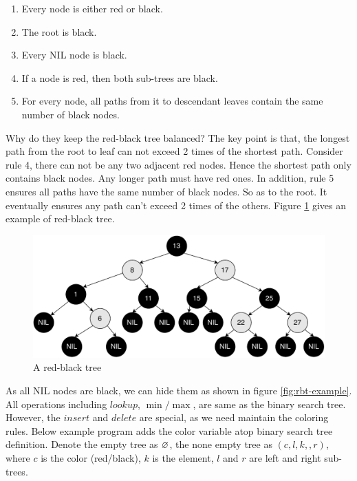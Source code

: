 \documentclass[b5paper]{article}
\begin{document}
\begin{enumerate}
\item Every node is either red or black.
\item The root is black.
\item Every NIL node is black.
\item If a node is red, then both sub-trees are black.
\item For every node, all paths from it to descendant leaves contain the same number of black nodes.
\end{enumerate}

Why do they keep the red-black tree balanced? The key point is that, the longest path from the root to leaf can not exceed 2 times of the shortest path. Consider rule 4, there can not be any two adjacent red nodes. Hence the shortest path only contains black nodes. Any longer path must have red ones. In addition, rule 5 ensures all paths have the same number of black nodes. So as to the root. It eventually ensures any path can't exceed 2 times of the others\cite{wiki-rbt}. Figure \cref{fig:rbt-example-with-nil} gives an example of red-black tree.

\begin{figure}[htbp]
  \centering
  \includegraphics[scale=0.35]{img/rbt-example-with-nil}
  \caption{A red-black tree}
  \label{fig:rbt-example-with-nil}
\end{figure}

As all NIL nodes are black, we can hide them as shown in figure \cref{fig:rbt-example}. All operations including $lookup$, $\min/\max$, are same as the binary search tree. However, the $insert$ and $delete$ are special, as we need maintain the coloring rules. Below example program adds the color variable atop binary search tree definition. Denote the empty tree as $\varnothing$, the none empty tree as $(c, l, k,, r)$, where $c$ is the color (red/black), $k$ is the element, $l$ and $r$ are left and right sub-trees.
\end{document}
